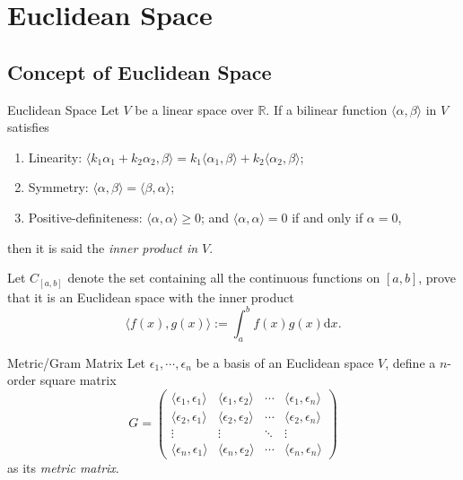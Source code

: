 
\section{Euclidean Space}

\subsection{Concept of Euclidean Space}

\begin{definition}{Euclidean Space}{}
  Let $V$ be a linear space over $\mathbb{R}$.
  If a bilinear function $\langle \alpha, \beta \rangle$ in $V$ satisfies
  \begin{enumerate}
  \item Linearity: $\langle k_1\alpha_1 + k_2\alpha_2, \beta \rangle = k_1
    \langle \alpha_1, \beta\rangle + k_2 \langle \alpha_2, \beta \rangle$;
  \item Symmetry: $\langle \alpha, \beta \rangle = \langle \beta, \alpha \rangle$;
  \item Positive-definiteness: $\langle \alpha, \alpha \rangle \geq 0$;
    and $\langle \alpha, \alpha \rangle = 0$ if and only
    if $\alpha = 0$,
  \end{enumerate}
  then it is said the \emph{inner product in $V$}.
\end{definition}

\begin{example}{}{}
  Let $C_{[a,b]}$ denote the set containing all the continuous functions on $[a,
  b]$, prove that it is an Euclidean space with the inner product 
  \begin{equation}
    \langle f(x), g(x) \rangle := \int_a^b f(x)g(x)\mathrm{d} x.
  \end{equation}
\end{example}

\begin{definition}{Metric/Gram Matrix}
  Let $\epsilon_1,\cdots,\epsilon_n$ be a basis of an Euclidean space $V$,
  define a $n$-order square matrix
  \begin{equation}
    G = \begin{pmatrix}
      \langle\epsilon_1,\epsilon_1\rangle & \langle\epsilon_1,\epsilon_2\rangle & \cdots & \langle\epsilon_1,\epsilon_n\rangle \\
      \langle\epsilon_2,\epsilon_1\rangle & \langle\epsilon_2,\epsilon_2\rangle & \cdots & \langle\epsilon_2,\epsilon_n\rangle \\
      \vdots & \vdots & \ddots & \vdots \\
      \langle\epsilon_n,\epsilon_1\rangle & \langle\epsilon_n,\epsilon_2\rangle & \cdots & \langle\epsilon_n,\epsilon_n\rangle
    \end{pmatrix}
  \end{equation}
  as its \emph{metric matrix}.
\end{definition}


